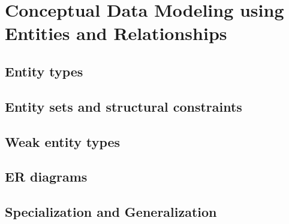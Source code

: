 \documentclass{article}
\begin{document}
	\section{Conceptual Data Modeling using Entities and Relationships}
	\subsection{Entity types}
	\subsection{Entity sets and structural constraints}
	\subsection{Weak entity types}
	\subsection{ER diagrams}
	\subsection{Specialization and Generalization}
\end{document}
